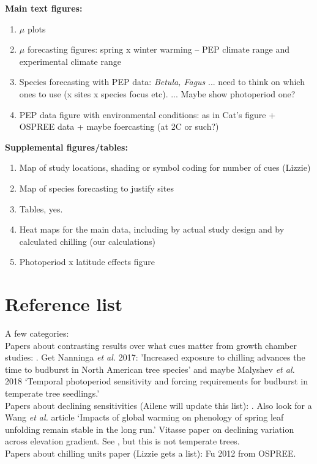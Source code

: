 \documentclass[11pt,letter]{article}
\begin{document}
{\bf Main text figures:}

\begin{enumerate}
\item $\mu$ plots
\item  $\mu$ forecasting figures: spring x winter warming -- PEP climate range and experimental climate range
\item Species forecasting with PEP data: \emph{Betula, Fagus} ... need to think on which ones to use (x sites x species focus etc). ... Maybe show photoperiod one?
\item PEP data figure with environmental conditions: as in Cat's figure + OSPREE data + maybe foercasting (at 2C or such?)
\end{enumerate}


{\bf Supplemental figures/tables:}
\begin{enumerate}
\item Map of study locations, shading or symbol coding for number of cues (Lizzie)
\item Map of species forecasting to justify sites
\item Tables, yes.
\item Heat maps for the main data, including by actual study design and by calculated chilling (our calculations)
\item Photoperiod x latitude effects figure
\end{enumerate}

\section{Reference list}

A few categories:\\

Papers about contrasting results over what cues matter from growth chamber studies: \cite{Basler:2012,Basler:2014aa,Caffarra:2011qf,Caffarra:2011a,Caffarra:2011b,Heide:2005aa,koerner2010b,Laube:2014a,vitasse2013,zohner2016}. Get Nanninga \emph{et al.} 2017: 'Increased exposure to chilling advances the time to budburst in North American tree species' and maybe Malyshev \emph{et al.} 2018 `Temporal photoperiod sensitivity and forcing requirements for budburst in temperate tree seedlings.'\\

Papers about declining sensitivities (Ailene will update this list): \cite{Rutishauser:2008fu,fu2015}. Also look for a Wang \emph{et al.} article `Impacts of global warming on phenology of spring leaf unfolding remain stable in the long run.' Vitasse paper on declining variation across elevation gradient. See \cite{yu2010}, but this is not temperate trees. \\

Papers about chilling units paper (Lizzie gets a list): Fu 2012 from OSPREE. \cite{harrington2015}\cite{lued2011,Luedeling:2011qe,Luedeling2013AgFM}\\


\end{document}
